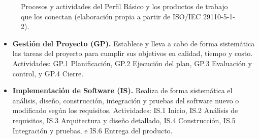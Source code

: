 \documentclass[11pt,a4paper]{article}
\begin{document}
\begin{figure}[H]
\caption{Procesos y actividades del Perfil Básico y los productos de trabajo que los conectan (elaboración propia a partir de ISO/IEC 29110-5-1-2).}
\label{fig:procesos}
\end{figure}

\begin{itemize}
  \item \textbf{Gestión del Proyecto (GP).} Establece y lleva a cabo de forma sistemática las tareas del proyecto para cumplir sus objetivos en calidad, tiempo y costo. Actividades: GP.1 Planificación, GP.2 Ejecución del plan, GP.3 Evaluación y control, y GP.4 Cierre.
  \item \textbf{Implementación de Software (IS).} Realiza de forma sistemática el análisis, diseño, construcción, integración y pruebas del software nuevo o modificado según los requisitos. Actividades: IS.1 Inicio, IS.2 Análisis de requisitos, IS.3 Arquitectura y diseño detallado, IS.4 Construcción, IS.5 Integración y pruebas, e IS.6 Entrega del producto.
\end{itemize}
\end{document}

